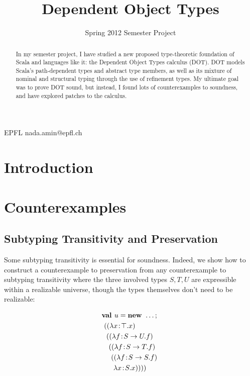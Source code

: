 \documentclass[preprint]{sigplanconf}
\begin{document}
\copyrightdata{[to be supplied]}


\title{Dependent Object Types}
\subtitle{Spring 2012 Semester Project}

           {EPFL}
           {nada.amin@epfl.ch}

\maketitle

\begin{abstract}
In my semester project, I have studied a new proposed type-theoretic
foundation of Scala and languages like it: the Dependent Object Types
calculus (DOT). DOT models Scala's path-dependent types and abstract
type members, as well as its mixture of nominal and structural typing
through the use of refinement types. My ultimate goal was to prove DOT
sound, but instead, I found lots of counterexamples to soundness, and
have explored patches to the calculus.
\end{abstract}


\section{Introduction}


\section{Counterexamples}

\subsection{Subtyping Transitivity and Preservation}\label{subpres}

Some subtyping transitivity is essential for soundness. Indeed, we show
how to construct a counterexample to preservation from any
counterexample to subtyping transitivity where the three involved
types $S, T, U$ are expressible within a realizable universe, though
the types themselves don't need to be realizable:

\begin{align*}
&\mlnew u \ldots {
\ \mlapp{\abs x \Top x}{
\ \ \mlapp{\abs f {S \tfun U} f}{
\ \ \ \mlapp{\abs f {S \tfun T} f}{
\ \ \ \ \mlapp{\abs f {S \tfun S} f}{
\ \ \  \ \ \abs x S x}}}}}
\end{align*}
\end{document}

